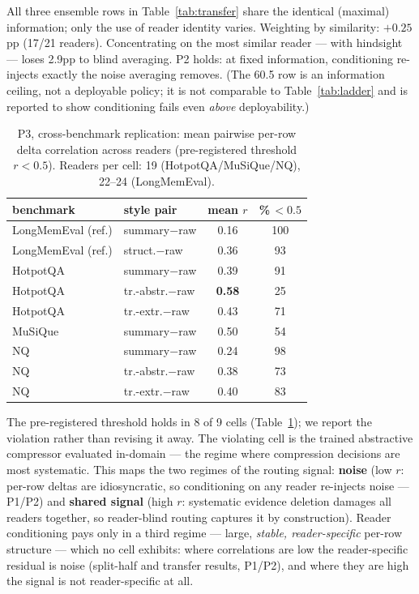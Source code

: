 All three ensemble rows in Table~\ref{tab:transfer} share the identical
(maximal) information; only the use of reader identity varies. Weighting by
similarity: $+0.25$pp (17/21 readers). Concentrating on the most similar reader
--- with hindsight --- loses 2.9pp to blind averaging. P2 holds: at fixed
information, conditioning re-injects exactly the noise averaging removes. (The
60.5 row is an information ceiling, not a deployable policy; it is not
comparable to Table~\ref{tab:ladder} and is reported to show conditioning fails
even \emph{above} deployability.)

\begin{table}[t]
\centering
\small
\begin{tabular}{@{}llcc@{}}
\toprule
benchmark & style pair & mean $r$ & \%\,$<0.5$ \\
\midrule
LongMemEval (ref.) & summary$-$raw & 0.16 & 100 \\
LongMemEval (ref.) & struct.$-$raw & 0.36 & 93 \\
HotpotQA & summary$-$raw & 0.39 & 91 \\
HotpotQA & tr.-abstr.$-$raw & \textbf{0.58} & 25 \\
HotpotQA & tr.-extr.$-$raw & 0.43 & 71 \\
MuSiQue & summary$-$raw & 0.50 & 54 \\
NQ & summary$-$raw & 0.24 & 98 \\
NQ & tr.-abstr.$-$raw & 0.38 & 73 \\
NQ & tr.-extr.$-$raw & 0.40 & 83 \\
\bottomrule
\end{tabular}
\caption{P3, cross-benchmark replication: mean pairwise per-row delta
correlation across readers (pre-registered threshold $r < 0.5$). Readers per
cell: 19 (HotpotQA/MuSiQue/NQ), 22--24 (LongMemEval).}
\label{tab:p3}
\end{table}

The pre-registered threshold holds in 8 of 9 cells (Table~\ref{tab:p3}); we
report the violation rather than revising it away. The violating cell is the
trained abstractive compressor evaluated in-domain --- the regime where
compression decisions are most systematic. This maps the two regimes of the
routing signal: \textbf{noise} (low $r$: per-row deltas are idiosyncratic, so
conditioning on any reader re-injects noise --- P1/P2) and \textbf{shared
signal} (high $r$: systematic evidence deletion damages all readers together, so
reader-blind routing captures it by construction). Reader conditioning pays only
in a third regime --- large, \emph{stable, reader-specific} per-row structure
--- which no cell exhibits: where correlations are low the reader-specific
residual is noise (split-half and transfer results, P1/P2), and where they are
high the signal is not reader-specific at all.


